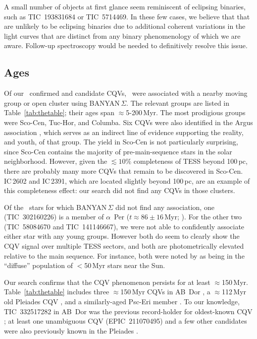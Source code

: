 \documentclass[11pt,twocolumn,tighten]{aastex63}
\begin{document}
A small number of objects at first glance seem reminiscent of
eclipsing binaries, such as TIC~193831684 or TIC~5714469.  In these
few cases, we believe that that are unlikely to be eclipsing binaries
due to additional coherent variations in the light curves that are
distinct from any binary phenomenology of which we are aware.
Follow-up spectroscopy would be needed to definitively resolve this issue.


\subsection{Ages}

Of our \ncpvsfound\ confirmed and candidate CQVs, \nnotfieldbanyan\
were associated with a nearby moving group or open cluster using
BANYAN\,$\Sigma$.  The relevant groups are listed in
Table~\ref{tab:thetable}; their ages span $\approx$5-200\,Myr.  The
most prodigious groups were Sco-Cen, Tuc-Hor, and Columba.  Six CQVs
were also identified in the Argus association
\citep{2019ApJ...870...27Z}, which serves as an indirect line of
evidence supporting the reality, and youth, of that group.  The yield
in Sco-Cen is not particularly surprising, since Sco-Cen contains the
majority of pre-main-sequence stars in the solar neighborhood.
However, given the $\lesssim$$10\%$ completeness
of TESS beyond 100\,pc, there are probably many more CQVs that remain to be discovered in
Sco-Cen.  IC\,2602 and IC\,2391, which are located slightly beyond
100\,pc, are an example of this completeness effect: our search did
not find any CQVs in those clusters.

Of the \ngoodsfieldbanyan\ stars for which BANYAN\,$\Sigma$ did not
find any association, one (TIC~302160226) is a member of $\alpha$~Per
($t\approx 86\pm16$\,Myr;
\citealt{2021A&A...645A..84M,2023AJ....166...14B}).  For the other two
(TIC~58084670 and TIC~141146667), we were not able to confidently
associate either star with any young groups.  However both do seem to
clearly show the CQV signal over multiple TESS sectors, and both are
photometrically elevated relative to the main sequence.  For instance,
both were noted by \citet{2021ApJ...917...23K} as being in the ``diffuse'' population
of $<$50\,Myr stars near the Sun.  

Our search confirms that the CQV phenomenon persists for at least
$\approx$150\,Myr.  Table~\ref{tab:thetable} includes three $\approx$150\,Myr CQVs
in AB~Dor \citep{2015MNRAS.454..593B}, a $\approx$112\,Myr old Pleiades CQV
\citep{2015ApJ...813..108D}, and
a similarly-aged Psc-Eri member \citep{2020A&A...639A..64R}.  To our knowledge, TIC~332517282
in AB~Dor was the previous record-holder for oldest-known CQV
\citep{2019ApJ...876..127Z,2022AJ....163..144G}; at least one
unambiguous CQV (EPIC~211070495) and a few other candidates were also
previously known in the Pleiades \citep{2016AJ....152..114R}.  
\end{document}
